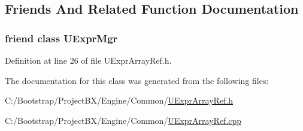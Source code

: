 \subsection{Friends And Related Function Documentation}
\hypertarget{class_u_expr_array_ref_aba1a84b84f2ff7cab4b76539215bd34}{
\subsubsection[{UExprMgr}]{\setlength{\rightskip}{0pt plus 5cm}friend class {\bf UExprMgr}}}
\label{class_u_expr_array_ref_aba1a84b84f2ff7cab4b76539215bd34}




Definition at line 26 of file UExprArrayRef.h.

The documentation for this class was generated from the following files:\begin{CompactItemize}
\item 
C:/Bootstrap/ProjectBX/Engine/Common/\hyperlink{_u_expr_array_ref_8h}{UExprArrayRef.h}\item 
C:/Bootstrap/ProjectBX/Engine/Common/\hyperlink{_u_expr_array_ref_8cpp}{UExprArrayRef.cpp}\end{CompactItemize}

